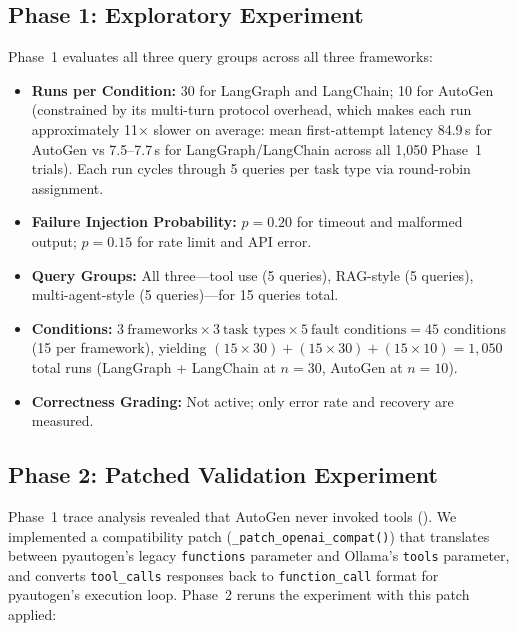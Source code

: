 \documentclass[make,article,submit,moreauthors,pdftex]{mdpi}
\begin{document}
\subsection{Phase 1: Exploratory Experiment}\label{sec:phase1-method}

Phase~1 evaluates all three query groups across all three frameworks:

\begin{itemize}
  \item \textbf{Runs per Condition:} 30 for LangGraph and LangChain; 10 for AutoGen (constrained by its multi-turn protocol overhead, which makes each run approximately 11$\times$ slower on average: mean first-attempt latency 84.9\,s for AutoGen vs 7.5--7.7\,s for LangGraph/LangChain across all 1{,}050 Phase~1 trials). Each run cycles through 5 queries per task type via round-robin assignment.
  \item \textbf{Failure Injection Probability:} $p = 0.20$ for timeout and malformed output; $p = 0.15$ for rate limit and API error.
  \item \textbf{Query Groups:} All three---tool use (5 queries), RAG-style (5 queries), multi-agent-style (5 queries)---for 15 queries total.
  \item \textbf{Conditions:} $3~\text{frameworks} \times 3~\text{task types} \times 5~\text{fault conditions} = 45$ conditions (15 per framework), yielding $(15 \times 30) + (15 \times 30) + (15 \times 10) = 1{,}050$ total runs (LangGraph + LangChain at $n = 30$, AutoGen at $n = 10$).
  \item \textbf{Correctness Grading:} Not active; only error rate and recovery are measured.
\end{itemize}

\subsection{Phase 2: Patched Validation Experiment}\label{sec:phase2-method}

{\color{magenta}Phase~1 trace analysis revealed that AutoGen never invoked tools (). We implemented a compatibility patch (\texttt{\_patch\_openai\_compat()}) that translates between pyautogen's legacy \texttt{functions} parameter and Ollama's \texttt{tools} parameter, and converts \texttt{tool\_calls} responses back to \texttt{function\_call} format for pyautogen's execution loop. Phase~2 reruns the experiment with this patch applied:}
\end{document}
